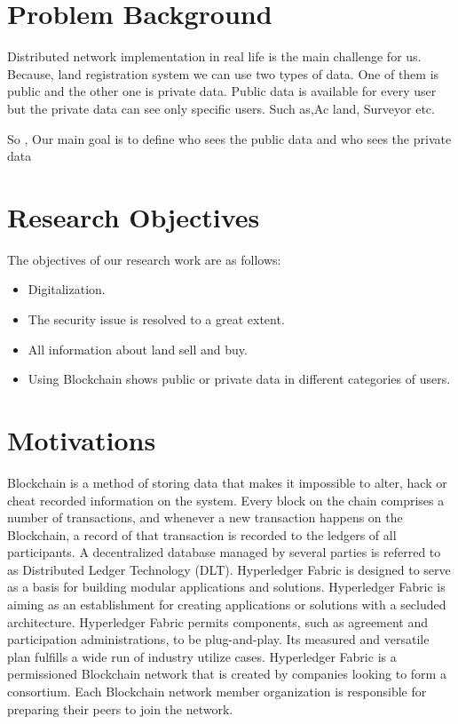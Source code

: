 \documentclass[12pt]{ucthesis}
\begin{document}
    
\section{Problem Background}
\label{problembackground}
    
    Distributed network implementation in real life is the main challenge for us. 
Because, land registration system we can use two types of data. One of them is 
public and the other one is private data. Public data is available for every user but 
the private data can see only specific users. Such as,Ac land, Surveyor etc.
 
So , Our main goal is to define who sees the public data and who sees the private 
data

\section{Research Objectives}
\label{researchobjectives}
    
   The objectives of our research work are as follows:
   \begin{itemize}
    	\item Digitalization.
    	\item The security issue is resolved to a great extent. 
    	\item All information about land sell and buy. 
    	\item Using Blockchain shows public or private data in different categories of users.
    \end{itemize}


\section{Motivations}
\label{motivations}
    
Blockchain is a method of storing data that makes it impossible to alter, hack or cheat recorded information on the system. Every block on the chain comprises a number of transactions, and whenever a new transaction happens on the Blockchain, a record of that transaction is recorded to the ledgers of all participants. A decentralized database managed by several parties is referred to as Distributed Ledger Technology (DLT). Hyperledger Fabric is designed to serve as a basis for building modular applications and solutions. Hyperledger Fabric is aiming as an establishment for creating applications or solutions with a secluded architecture. Hyperledger Fabric permits components, such as agreement and participation administrations, to be plug-and-play. Its measured and versatile plan fulfills a wide run of industry utilize cases.
Hyperledger Fabric is a permissioned Blockchain network that is created by companies looking to form a consortium. Each Blockchain network member organization is responsible for preparing their peers to join the network.
\end{document}
